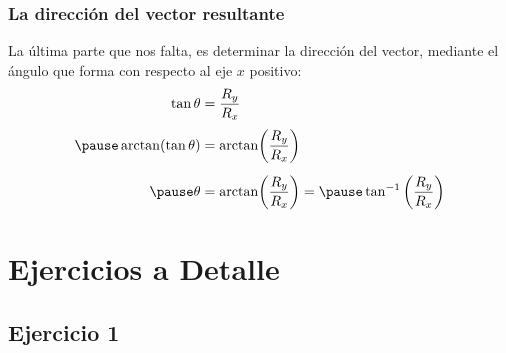 \documentclass[14pt]{beamer}
\begin{document}
\begin{frame}
\frametitle{La dirección del vector resultante}
La última parte que nos falta, es determinar la dirección del vector, mediante el ángulo que forma con respecto al eje $x$ positivo:
\pause
\begin{eqnarray*}
\begin{aligned}
\tan \theta &= \dfrac{R_{y}}{R_{x}} \\[0.3em] \pause
\arctan(\tan \theta) &= \arctan(\dfrac{R_{y}}{R_{x}}) \\[0.5em] \pause
\theta &= \arctan(\dfrac{R_{y}}{R_{x}}) = \pause \tan^{-1} \left( \dfrac{R_{y}}{R_{x}} \right)
\end{aligned}
\end{eqnarray*}
\end{frame}

\section{Ejercicios a Detalle}
\subsection{Ejercicio 1}
\end{document}
